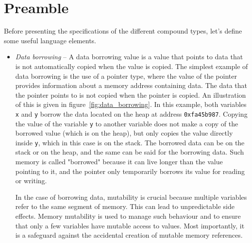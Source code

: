 \section{Preamble}%
\label{sec:preamble_compound_types}

Before presenting the specifications of the different compound types, let's
define some useful language elements.


\begin{itemize}
\item \textit{Data borrowing} -- A data borrowing value is a value that points
  to data that is not automatically copied when the value is copied. The
  simplest example of data borrowing is the use of a pointer type, where the
  value of the pointer provides information about a memory address containing
  data. The data that the pointer points to is not copied when the pointer is
  copied. An illustration of this is given in figure~\ref{fig:data_borrowing}.
  In this example, both variables \texttt{x} and \texttt{y} borrow the data
  located on the heap at address \texttt{0xfa45b987}. Copying the value of the
  variable \texttt{y} to another variable does not make a copy of the borrowed
  value (which is on the heap), but only copies the value directly inside
  \texttt{y}, which in this case is on the stack. The borrowed data can be on
  the stack or on the heap, and the same can be said for the borrowing data.
  Such memory is called "borrowed" because it can live longer than the value
  pointing to it, and the pointer only temporarily borrows its value for reading
  or writing.

  In the case of borrowing data, mutability is crucial because multiple variables
  refer to the same segment of memory. This can lead to unpredictable side
  effects. Memory mutability is used to manage such behaviour and to ensure that
  only a few variables have mutable access to values. Most importantly, it is a
  safeguard against the accidental creation of mutable memory references.


\end{itemize}

